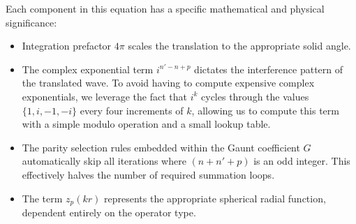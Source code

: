 Each component in this equation has a specific mathematical and physical significance:
\begin{itemize}
    \item Integration prefactor $4\pi$ scales the translation to the appropriate solid angle.
    \item The complex exponential term $i^{n' - n + p}$  dictates the interference pattern of the translated wave. To avoid having to compute expensive complex exponentials, we leverage the fact that $i^k$ cycles through the values $\{1, i, -1, -i\}$ every four increments of $k$, allowing us to compute this term with a simple modulo operation and a small lookup table.
    \item The parity selection rules embedded within the Gaunt coefficient $G$ automatically skip all iterations where $(n + n' + p)$ is an odd integer. This effectively halves the number of required summation loops.
    \item The term $z_p(kr)$ represents the appropriate spherical radial function, dependent entirely on the operator type.
\end{itemize}

